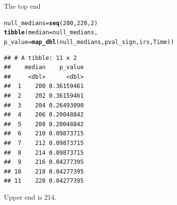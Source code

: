 \documentclass[unknownkeysallowed]{beamer}\usepackage[]{graphicx}\usepackage[]{color}
\makeatletter
\newcommand{\hlnum}[1]{\textcolor[rgb]{0.686,0.059,0.569}{#1}}%
\newcommand{\hlstd}[1]{\textcolor[rgb]{0.345,0.345,0.345}{#1}}%
\newcommand{\hlkwb}[1]{\textcolor[rgb]{0.69,0.353,0.396}{#1}}%
\newcommand{\hlkwc}[1]{\textcolor[rgb]{0.333,0.667,0.333}{#1}}%
\newcommand{\hlkwd}[1]{\textcolor[rgb]{0.737,0.353,0.396}{\textbf{#1}}}%
\newenvironment{kframe}{%
 \def\at@end@of@kframe{}%
 \ifinner\ifhmode%
  \def\at@end@of@kframe{\end{minipage}}%
  \begin{minipage}{\columnwidth}%
 \fi\fi%
 \def\FrameCommand##1{\hskip\@totalleftmargin \hskip-\fboxsep
 \colorbox{shadecolor}{##1}\hskip-\fboxsep
     \hskip-\linewidth \hskip-\@totalleftmargin \hskip\columnwidth}%
 \MakeFramed {\advance\hsize-\width
   \@totalleftmargin\z@ \linewidth\hsize
   \@setminipage}}%
 {\par\unskip\endMakeFramed%
 \at@end@of@kframe}
\newenvironment{knitrout}{}{} %
\makeatother
\begin{document}
\begin{frame}[fragile]{The top end}
 
  \begin{small}
\begin{knitrout}
\color{fgcolor}\begin{kframe}
\begin{alltt}
\hlstd{null_medians}\hlkwb{=}\hlkwd{seq}\hlstd{(}\hlnum{200}\hlstd{,}\hlnum{220}\hlstd{,}\hlnum{2}\hlstd{)}
\hlkwd{tibble}\hlstd{(}\hlkwc{median}\hlstd{=null_medians,}
       \hlkwc{p_value}\hlstd{=}\hlkwd{map_dbl}\hlstd{(null_medians,pval_sign,irs,Time))}
\end{alltt}
\begin{verbatim}
## # A tibble: 11 x 2
##    median    p_value
##     <dbl>      <dbl>
##  1    200 0.36159461
##  2    202 0.36159461
##  3    204 0.26493090
##  4    206 0.20048842
##  5    208 0.20048842
##  6    210 0.09873715
##  7    212 0.09873715
##  8    214 0.09873715
##  9    216 0.04277395
## 10    218 0.04277395
## 11    220 0.04277395
\end{verbatim}
\end{kframe}
\end{knitrout}

Upper end is 214.
  \end{small}
  
\end{frame}
\end{document}
